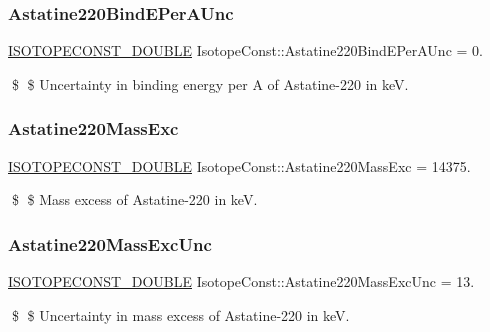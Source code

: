 \subsubsection{\texorpdfstring{Astatine220\+Bind\+E\+Per\+A\+Unc}{Astatine220BindEPerAUnc}}
{\footnotesize\ttfamily \mbox{\hyperlink{group___isotope_const-_macros_ga8f45a7272ce02c0b4c65c44636ed719a}{I\+S\+O\+T\+O\+P\+E\+C\+O\+N\+S\+T\+\_\+\+D\+O\+U\+B\+LE}} Isotope\+Const\+::\+Astatine220\+Bind\+E\+Per\+A\+Unc = 0.}

\$ \$ Uncertainty in binding energy per A of Astatine-\/220 in keV. \mbox{\label{group___isotope_const-_astatine-_at220_ga50a11f8b11dc49405b12f6e83de1f476}} 
\subsubsection{\texorpdfstring{Astatine220\+Mass\+Exc}{Astatine220MassExc}}
{\footnotesize\ttfamily \mbox{\hyperlink{group___isotope_const-_macros_ga8f45a7272ce02c0b4c65c44636ed719a}{I\+S\+O\+T\+O\+P\+E\+C\+O\+N\+S\+T\+\_\+\+D\+O\+U\+B\+LE}} Isotope\+Const\+::\+Astatine220\+Mass\+Exc = 14375.}

\$ \$ Mass excess of Astatine-\/220 in keV. \mbox{\label{group___isotope_const-_astatine-_at220_ga812c8a89ecfa3e31238132dcbfd5802d}} 
\subsubsection{\texorpdfstring{Astatine220\+Mass\+Exc\+Unc}{Astatine220MassExcUnc}}
{\footnotesize\ttfamily \mbox{\hyperlink{group___isotope_const-_macros_ga8f45a7272ce02c0b4c65c44636ed719a}{I\+S\+O\+T\+O\+P\+E\+C\+O\+N\+S\+T\+\_\+\+D\+O\+U\+B\+LE}} Isotope\+Const\+::\+Astatine220\+Mass\+Exc\+Unc = 13.}

\$ \$ Uncertainty in mass excess of Astatine-\/220 in keV. \mbox{\label{group___isotope_const-_astatine-_at220_ga40089a61c471ef3fd25dcedf24fb00c0}} 
